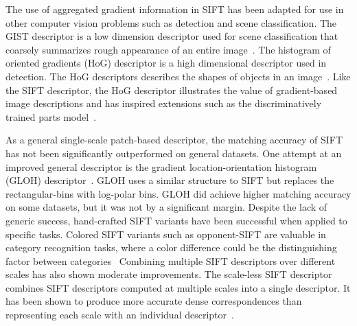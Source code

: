         The use of aggregated gradient information in SIFT has been adapted for use in other computer vision
        problems such as detection and scene classification.
        The GIST descriptor is a low dimension descriptor used for scene classification that coarsely summarizes
        rough appearance of an entire image~\cite{oliva_modeling_2001, douze_evaluation_2009}.
        The histogram of oriented gradients (HoG) descriptor is a high dimensional descriptor used in detection.
        The HoG descriptors describes the shapes of objects in an image~\cite{dalal_histograms_2005}. Like the SIFT
        descriptor, the HoG descriptor illustrates the value of gradient-based image descriptions and has inspired
        extensions such as the discriminatively trained parts model~\cite{felzenszwalb_object_2010}.

        As a general single-scale patch-based descriptor, the matching accuracy of SIFT has not been significantly
        outperformed on general datasets.
        One attempt at an improved general descriptor is the gradient location-orientation histogram (GLOH)
        descriptor~\cite{mikolajczyk_performance_2005}. GLOH uses a similar structure to SIFT but replaces the
        rectangular-bins with log-polar bins. GLOH did achieve higher matching accuracy on some datasets, but it
        was not by a significant margin.
        Despite the lack of generic success, hand-crafted SIFT variants have been successful when applied to
        specific tasks.
        Colored SIFT variants such as opponent-SIFT are valuable in category recognition tasks, where a color
        difference could be the distinguishing factor between categories~\cite{van_de_sande_evaluating_2010}
        Combining multiple SIFT descriptors over different scales has also shown moderate improvements. The
        scale-less SIFT descriptor combines SIFT descriptors computed at multiple scales into a single descriptor.
        It has been shown to produce more accurate dense correspondences than representing each scale with an
        individual descriptor~\cite{hassner_sifts_2012}.


